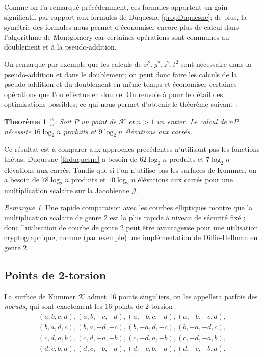 \documentclass[a4paper]{article}
\newtheorem{theoreme}{Theorème}[section]
\theoremstyle{definition}
\theoremstyle{remark}
\newtheorem{remarque}{Remarque}
\numberwithin{equation}{section}
\begin{document}
Comme on l'a remarqué précédemment, ces formules apportent un gain significatif par rapport aux formules de Duquesne \ref{propDuquesne}; de plus, la symétrie des formules nous permet d'économiser encore plus de calcul dans l'algorithme de Montgomery car certaines opérations sont communes au doublement et à la pseudo-addition.

On remarque par exemple que les calculs de $x^2,y^2,z^2,t^2$ sont nécessaire dans la pseudo-addition et dans le doublement; on peut donc faire les calculs de la pseudo-addition et du doublement en même temps et économiser certaines opérations que l'on effectue en double. On renvoie à \citep{gaudry} pour le détail des optimisations possibles; ce qui nous permet d'obtenir le théorème suivant :
\begin{theoreme}[\citet{gaudry}]
\label{mulscal}
Soit $P$ un point de $\mathcal{K}$ et $n > 1$ un entier. Le calcul de $nP$ nécessite $16\log_2 n$ produits et $9\log_2 n$ élévations aux carrés.
\end{theoreme}

Ce résultat est à comparer aux approches précédentes n'utilisant pas les fonctions thêtas, Duquesne \ref{thduquesne} a besoin de $62\log_2 n$ produits et $7\log_2 n$ élévations aux carrés. Tandis que si l'on n'utilise pas les surfaces de Kummer, on a besoin de $78\log_2 n$ produits et $10\log_2 n$ élévations aux carrés pour une multiplication scalaire sur la Jacobienne $\mathcal{J}$.

\begin{remarque}
Une rapide comparaison avec les courbes elliptiques montre que la multiplication scalaire de genre 2 est la plus rapide à niveau de sécurité fixé \citep[5.5]{gaudry}; donc l'utilisation de courbe de genre 2 peut être avantageuse pour une utilisation cryptographique, comme (par exemple) une implémentation de Diffie-Hellman en genre 2.
\end{remarque}

\subsection{Points de 2-torsion}

La surface de Kummer $\mathcal{K}$ admet 16 points singuliers, on les appellera parfois des \emph{noeuds}, qui sont exactement les 16 points de 2-torsion :
\begin{align*}
   &(a,b,c,d),(a,b,-c,-d),(a,-b,c,-d),(a,-b,-c,d),& \\
   &(b,a,d,c),(b,a,-d,-c),(b,-a,d,-c),(b,-a,-d,c),& \\
   &(c,d,a,b),(c,d,-a,-b),(c,-d,a,-b),(c,-d,-a,b),& \\
   &(d,c,b,a),(d,c,-b,-a),(d,-c,b,-a),(d,-c,-b,a).&
\end{align*}
\end{document}
